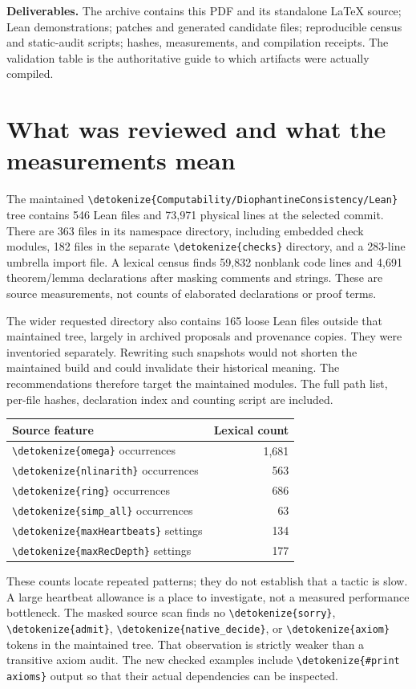 \documentclass[11pt,letterpaper]{article}
\newcommand{\code}[1]{\expandafter\nolinkurl\expandafter{\detokenize{#1}}}
\begin{document}
\textbf{Deliverables.} The archive contains this PDF and its standalone LaTeX source; Lean demonstrations; patches and generated candidate files; reproducible census and static-audit scripts; hashes, measurements, and compilation receipts. The validation table is the authoritative guide to which artifacts were actually compiled.
\newpage
\tableofcontents
\newpage

\section{What was reviewed and what the measurements mean}

The maintained \code{Computability/DiophantineConsistency/Lean} tree contains 546 Lean files and 73,971 physical lines at the selected commit. There are 363 files in its namespace directory, including embedded check modules, 182 files in the separate \code{checks} directory, and a 283-line umbrella import file. A lexical census finds 59,832 nonblank code lines and 4,691 theorem/lemma declarations after masking comments and strings. These are source measurements, not counts of elaborated declarations or proof terms.

The wider requested directory also contains 165 loose Lean files outside that maintained tree, largely in archived proposals and provenance copies. They were inventoried separately. Rewriting such snapshots would not shorten the maintained build and could invalidate their historical meaning. The recommendations therefore target the maintained modules. The full path list, per-file hashes, declaration index and counting script are included.

\begin{center}
\begin{tabular}{lr}
\toprule
Source feature & Lexical count\\
\midrule
\code{omega} occurrences & 1,681\\
\code{nlinarith} occurrences & 563\\
\code{ring} occurrences & 686\\
\code{simp_all} occurrences & 63\\
\code{maxHeartbeats} settings & 134\\
\code{maxRecDepth} settings & 177\\
\bottomrule
\end{tabular}
\end{center}

These counts locate repeated patterns; they do not establish that a tactic is slow. A large heartbeat allowance is a place to investigate, not a measured performance bottleneck. The masked source scan finds no \code{sorry}, \code{admit}, \code{native_decide}, or \code{axiom} tokens in the maintained tree. That observation is strictly weaker than a transitive axiom audit. The new checked examples include \code{#print axioms} output so that their actual dependencies can be inspected.
\end{document}
